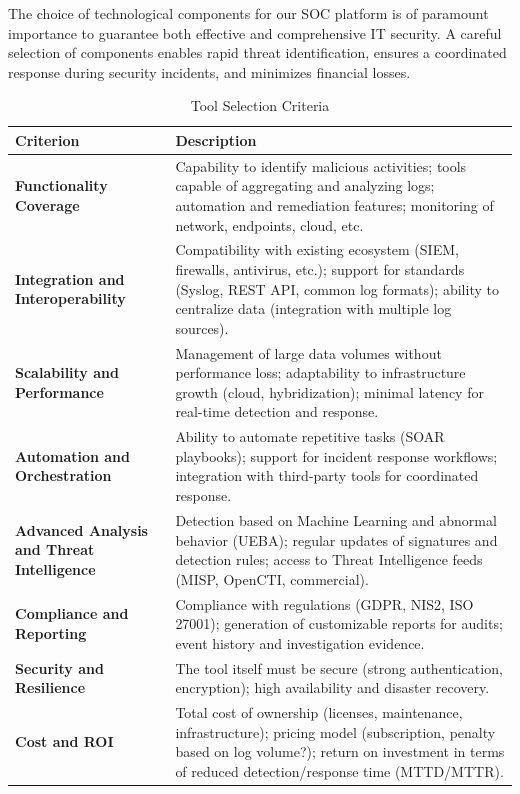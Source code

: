 The choice of technological components for our SOC platform is of paramount importance to guarantee both effective and comprehensive IT security. A careful selection of components enables rapid threat identification, ensures a coordinated response during security incidents, and minimizes financial losses.

\begin{table}[H]
\centering
\caption{Tool Selection Criteria}
\label{tab:criteria}
\renewcommand{\arraystretch}{1.4}
\begin{tabular}{>{\raggedright\arraybackslash}p{3cm} p{10.5cm}}
\toprule
\rowcolor{tableheader}
\textbf{Criterion} & \textbf{Description} \\
\midrule
\textbf{Functionality Coverage} & Capability to identify malicious activities; tools capable of aggregating and analyzing logs; automation and remediation features; monitoring of network, endpoints, cloud, etc. \\
\midrule
\textbf{Integration and Interoperability} & Compatibility with existing ecosystem (SIEM, firewalls, antivirus, etc.); support for standards (Syslog, REST API, common log formats); ability to centralize data (integration with multiple log sources). \\
\midrule
\textbf{Scalability and Performance} & Management of large data volumes without performance loss; adaptability to infrastructure growth (cloud, hybridization); minimal latency for real-time detection and response. \\
\midrule
\textbf{Automation and Orchestration} & Ability to automate repetitive tasks (SOAR playbooks); support for incident response workflows; integration with third-party tools for coordinated response. \\
\midrule
\textbf{Advanced Analysis and Threat Intelligence} & Detection based on Machine Learning and abnormal behavior (UEBA); regular updates of signatures and detection rules; access to Threat Intelligence feeds (MISP, OpenCTI, commercial). \\
\midrule
\textbf{Compliance and Reporting} & Compliance with regulations (GDPR, NIS2, ISO 27001); generation of customizable reports for audits; event history and investigation evidence. \\
\midrule
\textbf{Security and Resilience} & The tool itself must be secure (strong authentication, encryption); high availability and disaster recovery. \\
\midrule
\textbf{Cost and ROI} & Total cost of ownership (licenses, maintenance, infrastructure); pricing model (subscription, penalty based on log volume?); return on investment in terms of reduced detection/response time (MTTD/MTTR). \\

\end{tabular}
\end{table}
